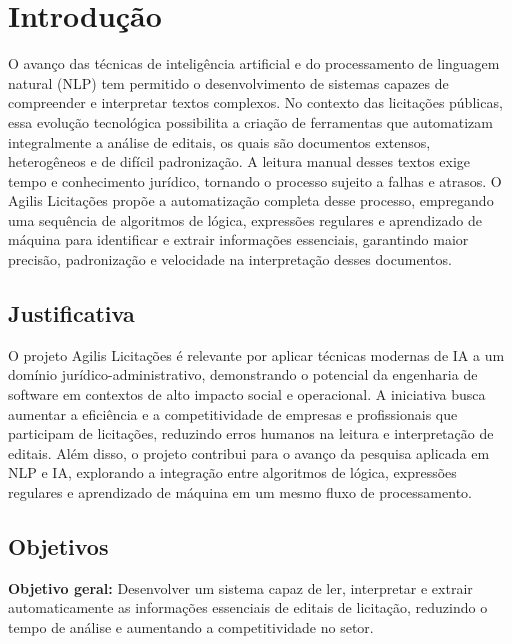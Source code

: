 \documentclass[a4paper,12pt]{article}
\begin{document}
\newpage
\tableofcontents
\newpage

\section{Introdução}


O avanço das técnicas de inteligência artificial e do processamento de
linguagem natural (NLP) tem permitido o desenvolvimento de sistemas capazes
de compreender e interpretar textos complexos. No contexto das licitações
públicas, essa evolução tecnológica possibilita a criação de ferramentas que
automatizam integralmente a análise de editais, os quais são documentos
extensos, heterogêneos e de difícil padronização.
A leitura manual desses textos exige tempo e conhecimento jurídico,
tornando o processo sujeito a falhas e atrasos. O Agilis Licitações propõe a
automatização completa desse processo, empregando uma sequência de
algoritmos de lógica, expressões regulares e aprendizado de máquina para
identificar e extrair informações essenciais, garantindo maior precisão,
padronização e velocidade na interpretação desses documentos.

\subsection{Justificativa}
O projeto Agilis Licitações é relevante por aplicar técnicas modernas de
IA a um domínio jurídico-administrativo, demonstrando o potencial da engenharia
de software em contextos de alto impacto social e operacional.
A iniciativa busca aumentar a eficiência e a competitividade de empresas
e profissionais que participam de licitações, reduzindo erros humanos na leitura
e interpretação de editais. Além disso, o projeto contribui para o avanço da
pesquisa aplicada em NLP e IA, explorando a integração entre algoritmos de
lógica, expressões regulares e aprendizado de máquina em um mesmo fluxo de
processamento.

\subsection{Objetivos}
\textbf{Objetivo geral:} Desenvolver um sistema capaz de ler, interpretar e extrair
automaticamente as informações essenciais de editais de licitação, reduzindo o
tempo de análise e aumentando a competitividade no setor.
\end{document}
